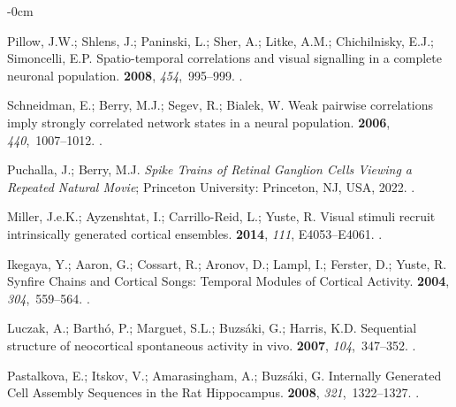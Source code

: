 \documentclass[brainsci, %
               review,accept,pdftex,moreauthors
               ]{Definitions/mdpi}
\begin{document}
\begin{adjustwidth}{-\extralength}{0cm}
\begin{thebibliography}{999}
Pillow, J.W.; Shlens, J.; Paninski, L.; Sher, A.; Litke, A.M.; Chichilnisky,
  E.J.; Simoncelli, E.P.
\newblock Spatio-temporal correlations and visual signalling in a complete
  neuronal population.
 {\bf 2008}, {\em 454},~995--999.
.

Schneidman, E.; Berry, M.J.; Segev, R.; Bialek, W.
\newblock Weak pairwise correlations imply strongly correlated network states
  in a neural population.
 {\bf 2006}, {\em 440},~1007--1012.
.

Puchalla, J.; Berry, M.J.
\newblock \emph{Spike {Trains} of {Retinal} {Ganglion} {Cells} {Viewing} a {Repeated}
  {Natural} {Movie}}; {Princeton University: Princeton, NJ, USA,} %
  {2022}.
.

Miller, J.e.K.; Ayzenshtat, I.; Carrillo-Reid, L.; Yuste, R.
\newblock Visual stimuli recruit intrinsically generated cortical ensembles.
 {\bf 2014},
  {\em 111}, E4053--E4061.
.

Ikegaya, Y.; Aaron, G.; Cossart, R.; Aronov, D.; Lampl, I.; Ferster, D.; Yuste,
  R.
\newblock Synfire {Chains} and {Cortical} {Songs}: {Temporal} {Modules} of
  {Cortical} {Activity}.
 {\bf 2004}, {\em 304},~559--564.
.

Luczak, A.; Barthó, P.; Marguet, S.L.; Buzsáki, G.; Harris, K.D.
\newblock Sequential structure of neocortical spontaneous activity in vivo.
 {\bf 2007},
  {\em 104},~347--352.
.

Pastalkova, E.; Itskov, V.; Amarasingham, A.; Buzsáki, G.
\newblock Internally {Generated} {Cell} {Assembly} {Sequences} in the {Rat}
  {Hippocampus}.
 {\bf 2008}, {\em 321},~1322--1327.
.


\end{thebibliography}
\end{adjustwidth}
\end{document}
